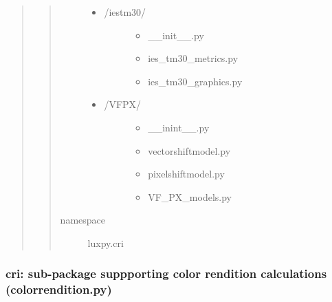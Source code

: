 \documentclass[letterpaper,10pt,english]{sphinxmanual}
\begin{document}
\begin{quote}
\begin{quote}
\begin{description}
\begin{itemize}
\begin{description}
\begin{itemize}
\end{itemize}

\end{description}

\item {} \begin{description}
\item[{/iestm30/}] \leavevmode\begin{itemize}
\item {} 
\_\_init\_\_.py

\item {} 
ies\_tm30\_metrics.py

\item {} 
ies\_tm30\_graphics.py

\end{itemize}

\end{description}

\item {} \begin{description}
\item[{/VFPX/}] \leavevmode\begin{itemize}
\item {} 
\_\_inint\_\_.py

\item {} 
vectorshiftmodel.py

\item {} 
pixelshiftmodel.py

\item {} 
VF\_PX\_models.py

\end{itemize}

\end{description}

\end{itemize}

\item[{namespace}] \leavevmode
luxpy.cri

\end{description}\end{quote}
\end{quote}
\label{\detokenize{color:module-luxpy.color.cri}}

\subsubsection{cri: sub-package suppporting color rendition calculations (colorrendition.py)}
\label{\detokenize{color:cri-sub-package-suppporting-color-rendition-calculations-colorrendition-py}}
\end{document}
